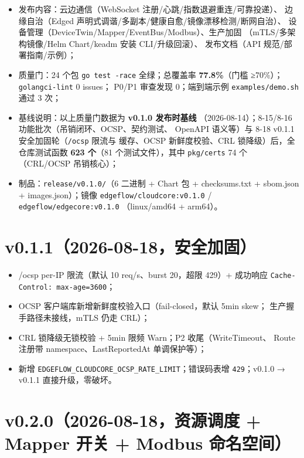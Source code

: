 \begin{itemize}
  \item 发布内容：云边通信（WebSocket 注册/心跳/指数退避重连/可靠投递）、
        边缘自治（Edged 声明式调谐/多副本/健康自愈/镜像漂移检测/断网自治）、
        设备管理（DeviceTwin/Mapper/EventBus/Modbus）、生产加固
        （mTLS/多架构镜像/Helm Chart/keadm 安装 CLI/升级回滚）、
        发布文档（API 规范/部署指南/示例）；
  \item 质量门：24 个包 \texttt{go test -race} 全绿；总覆盖率
        \textbf{77.8\%}（门槛 ≥70\%）；\texttt{golangci-lint} 0 issues；
        P0/P1 审查发现 0；端到端示例 \texttt{examples/demo.sh} 通过 3 次；
  \item 基线说明：以上质量门数据为 \textbf{v0.1.0 发布时基线}
        （2026-08-14）；8-15/8-16 功能批次（吊销闭环、OCSP、契约测试、
        OpenAPI 语义等）与 8-18 v0.1.1 安全加固轮（\texttt{/ocsp} 限流与
        缓存、OCSP 新鲜度校验、CRL 锁降级）后，全仓库测试函数
        \textbf{623 个}（81 个测试文件），其中 \texttt{pkg/certs} 74 个
        （CRL/OCSP 吊销核心）；
  \item 制品：\texttt{release/v0.1.0/}（6 二进制 + Chart 包 +
        checksums.txt + sbom.json + images.json）；镜像
        \texttt{edgeflow/cloudcore:v0.1.0} / \texttt{edgeflow/edgecore:v0.1.0}
        （linux/amd64 + arm64）。
\end{itemize}

\section{v0.1.1（2026-08-18，安全加固）}

\begin{itemize}
  \item /ocsp per-IP 限流（默认 10 req/s、burst 20，超限 429）+ 成功响应
        \texttt{Cache-Control: max-age=3600}；
  \item OCSP 客户端库新增新鲜度校验入口（fail-closed，默认 5min skew；
        生产握手路径未接线，mTLS 仍走 CRL）；
  \item CRL 锁降级无锁校验 + 5min 限频 Warn；P2 收尾（WriteTimeout、
        Route 注册带 namespace、LastReportedAt 单调保护等）；
  \item 新增 \texttt{EDGEFLOW\_CLOUDCORE\_OCSP\_RATE\_LIMIT}；错误码表增
        \texttt{429}；v0.1.0 → v0.1.1 直接升级，零破坏。
\end{itemize}

\section{v0.2.0（2026-08-18，资源调度 + Mapper 开关 + Modbus 命名空间）}

